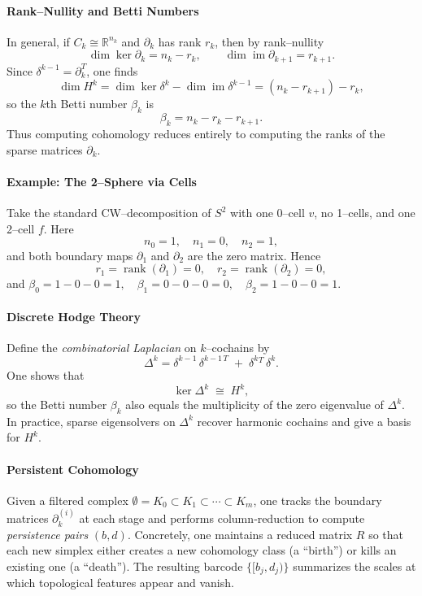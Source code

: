 \paragraph{Rank–Nullity and Betti Numbers}  
In general, if \(C_k\cong\mathbb R^{n_k}\) and \(\partial_k\) has rank \(r_k\), then by rank–nullity
\[
\dim\ker\partial_k = n_k - r_k,\qquad
\dim\operatorname{im}\partial_{k+1} = r_{k+1}.
\]
Since \(\delta^{k-1}=\partial_k^T\), one finds
\[
\dim H^k
= \dim\ker\delta^k - \dim\operatorname{im}\delta^{k-1}
= (n_k - r_{k+1}) - r_k,
\]
so the \(k\)th Betti number \(\beta_k\) is
\[
\beta_k = n_k - r_k - r_{k+1}.
\]
Thus computing cohomology reduces entirely to computing the ranks of the sparse matrices \(\partial_k\).

\paragraph{Example: The 2–Sphere via Cells}  
Take the standard CW–decomposition of \(S^2\) with one 0–cell \(v\), no 1–cells, and one 2–cell \(f\).  Here
\[
n_0=1,\quad n_1=0,\quad n_2=1,
\]
and both boundary maps \(\partial_1\) and \(\partial_2\) are the zero matrix.  Hence
\[
r_1 = \operatorname{rank}(\partial_1) = 0,\quad
r_2 = \operatorname{rank}(\partial_2)=0,
\]
and
\(\beta_0 = 1-0-0 = 1,\quad \beta_1 = 0-0-0=0,\quad \beta_2 = 1-0-0=1.\)

\paragraph{Discrete Hodge Theory}  
Define the \emph{combinatorial Laplacian} on \(k\)–cochains by
\[
\Delta^k = \delta^{k-1}\,\delta^{k-1\,T} \;+\;\delta^k{}^{T}\,\delta^k.
\]
One shows that
\[
\ker\Delta^k \;\cong\;H^k,
\]
so the Betti number \(\beta_k\) also equals the multiplicity of the zero eigenvalue of \(\Delta^k\).  In practice, sparse eigensolvers on \(\Delta^k\) recover harmonic cochains and give a basis for \(H^k\).

\paragraph{Persistent Cohomology}  
Given a filtered complex
\(\emptyset = K_0 \subset K_1 \subset \cdots \subset K_m\),
one tracks the boundary matrices \(\partial_k^{(i)}\) at each stage and performs column‐reduction to compute \emph{persistence pairs} \((b,d)\).  Concretely, one maintains a reduced matrix \(R\) so that each new simplex either creates a new cohomology class (a “birth”) or kills an existing one (a “death”).  The resulting barcode \(\{[b_j,d_j)\}\) summarizes the scales at which topological features appear and vanish.

